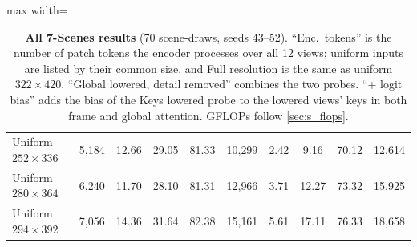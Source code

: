\documentclass[10pt,twocolumn,letterpaper]{article}
\begin{document}
\begin{table}[t]
\begin{adjustbox}{max width=\linewidth}
\begin{tabular}{@{}lccccccccc@{}}
Uniform $252{\times}336$                 & 5{,}184 & 12.66 & 29.05 & 81.33 & 10{,}299 & 2.42 & 9.16 & 70.12 & 12{,}614 \\
Uniform $280{\times}364$                 & 6{,}240 & 11.70 & 28.10 & 81.31 & 12{,}966 & 3.71 & 12.27 & 73.32 & 15{,}925 \\
Uniform $294{\times}392$                 & 7{,}056 & 14.36 & 31.64 & 82.38 & 15{,}161 & 5.61 & 17.11 & 76.33 & 18{,}658 \\
\bottomrule
\end{tabular}
\end{adjustbox}
\caption{\textbf{All 7-Scenes results} (70 scene-draws, seeds 43--52). ``Enc.\ tokens'' is the number of patch tokens the encoder processes over all 12 views; uniform inputs are listed by their common size, and Full resolution is the same as uniform $322{\times}420$. ``Global lowered, detail removed'' combines the two probes. ``+ logit bias'' adds the bias of the Keys lowered probe to the lowered views' keys in both frame and global attention. GFLOPs follow \cref{sec:s_flops}.}
\label{tab:s_7s}
\end{table}
\end{document}
